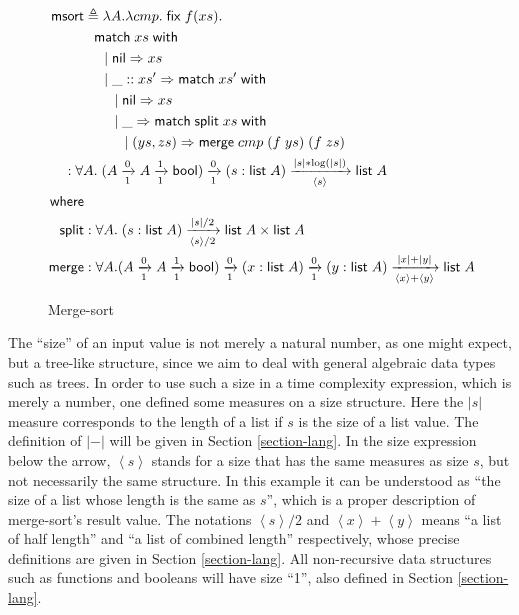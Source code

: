 \documentclass[preprint]{sigplanconf}
\newcommand{\arrow}[4]{#1\xrightarrow[#3]{#2}#4}
\newcommand{\symmatch}{\mathsf{match}}
\newcommand{\symwith}{\mathsf{\;with\;}}
\newcommand{\symlist}{\mathsf{list}}
\newcommand{\symnil}{\mathsf{nil}}
\newcommand{\symfix}{\mathsf{fix}}
\newcommand{\symbool}{\mathsf{bool}}
\newcommand{\symmerge}{\mathsf{merge}}
\newcommand{\intro}[2]{(#1 : #2)}
\newcommand{\symmsort}{\mathsf{msort}}
\newcommand{\symsplit}{\mathsf{split}}
\newcommand{\defeq}{\triangleq}
\newcommand{\Sstats}[1]{\left \langle #1 \right \rangle}
\begin{document}
\begin{figure}
\begin{align*}
\symmsort &\defeq \lambda A. \lambda cmp.\;\symfix\;f(xs). \\
& \hspace{.1in} \symmatch\;xs\symwith \\
& \hspace{.2in} |\; \symnil\Rightarrow xs \\
& \hspace{.2in} |\; \_::xs' \Rightarrow \symmatch\;xs'\symwith \\
& \hspace{.3in} |\; \symnil\Rightarrow xs \\
& \hspace{.3in} |\; \_ \Rightarrow \symmatch\; \symsplit\;xs \symwith \\
& \hspace{.4in} |\; (ys, zs) \Rightarrow \symmerge\;cmp\;(f\;ys)\;(f\;zs) \\
& \hspace{-0.2in} : \forall A.\;\arrow{(\arrow{A}{0}{1}{\arrow{A}{1}{1}{\symbool}})}{0}{1}{\arrow{\intro{s}{\symlist\;A}}{|s|*\log(|s|)}{\Sstats{s}}{\symlist\;A}} \\
\mathsf{where} & \\
\symsplit &: \forall A.\;\arrow{\intro{s}{\symlist\;A}}{|s|/2}{\Sstats{s}/2}{\symlist\;A\times\symlist\;A} \\
\symmerge &: \forall A.\arrow{(\arrow{A}{0}{1}{\arrow{A}{1}{1}{\symbool}})}{0}{1}{\arrow{\intro{x}{\symlist\;A}}{0}{1}{\arrow{\intro{y}{\symlist\;A}}{|x|+|y|}{\Sstats{x}+\Sstats{y}}{\symlist\;A}}}
\end{align*}
\caption{\label{msort}Merge-sort}
\end{figure}

The ``size'' of an input value is not merely a natural number, as one might expect, but a tree-like structure, since we aim to deal with general algebraic data types such as trees. In order to use such a size in a time complexity expression, which is merely a number, one defined some measures on a size structure. Here the $|s|$ measure corresponds to the length of a list if $s$ is the size of a list value. The definition of $|-|$ will be given in Section \ref{section-lang}. In the size expression below the arrow, $\Sstats{s}$ stands for a size that has the same measures as size $s$, but not necessarily the same structure. In this example it can be understood as ``the size of a list whose length is the same as $s$'', which is a proper description of merge-sort's result value.  The notations $\Sstats{s}/2$ and $\Sstats{x}+\Sstats{y}$ means ``a list of half length'' and ``a list of combined length'' respectively, whose precise definitions are given in Section \ref{section-lang}. All non-recursive data structures such as functions and booleans will have size ``1'', also defined in Section \ref{section-lang}.
\end{document}
